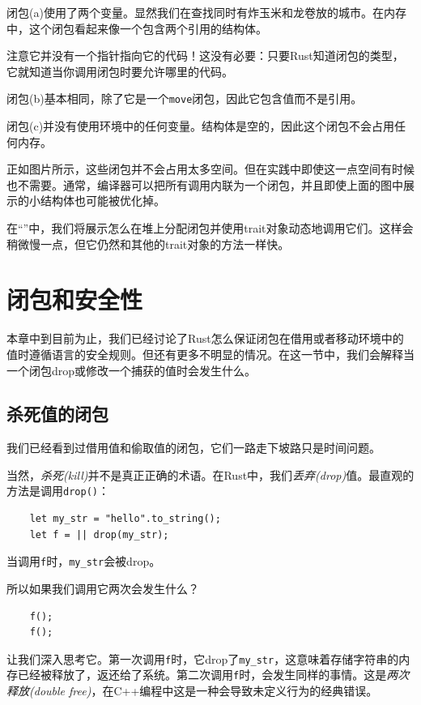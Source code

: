 闭包(a)使用了两个变量。显然我们在查找同时有炸玉米和龙卷放的城市。在内存中，这个闭包看起来像一个包含两个引用的结构体。

注意它并没有一个指针指向它的代码！这没有必要：只要Rust知道闭包的类型，它就知道当你调用闭包时要允许哪里的代码。

闭包(b)基本相同，除了它是一个\texttt{move}闭包，因此它包含值而不是引用。

闭包(c)并没有使用环境中的任何变量。结构体是空的，因此这个闭包不会占用任何内存。

正如图片所示，这些闭包并不会占用太多空间。但在实践中即使这一点空间有时候也不需要。通常，编译器可以把所有调用内联为一个闭包，并且即使上面的图中展示的小结构体也可能被优化掉。

在“”中，我们将展示怎么在堆上分配闭包并使用trait对象动态地调用它们。这样会稍微慢一点，但它仍然和其他的trait对象的方法一样快。

\section{闭包和安全性}

本章中到目前为止，我们已经讨论了Rust怎么保证闭包在借用或者移动环境中的值时遵循语言的安全规则。但还有更多不明显的情况。在这一节中，我们会解释当一个闭包drop或修改一个捕获的值时会发生什么。

\subsection{杀死值的闭包}
我们已经看到过借用值和偷取值的闭包，它们一路走下坡路只是时间问题。

当然，\emph{杀死(kill)}并不是真正正确的术语。在Rust中，我们\emph{丢弃(drop)}值。最直观的方法是调用\texttt{drop()}：
\begin{verbatim}
    let my_str = "hello".to_string();
    let f = || drop(my_str);
\end{verbatim}

当调用\texttt{f}时，\texttt{my\_str}会被drop。

所以如果我们调用它两次会发生什么？
\begin{verbatim}
    f();
    f();
\end{verbatim}

让我们深入思考它。第一次调用\texttt{f}时，它drop了\texttt{my\_str}，这意味着存储字符串的内存已经被释放了，返还给了系统。第二次调用\texttt{f}时，会发生同样的事情。这是\emph{两次释放(double free)}，在C++编程中这是一种会导致未定义行为的经典错误。

